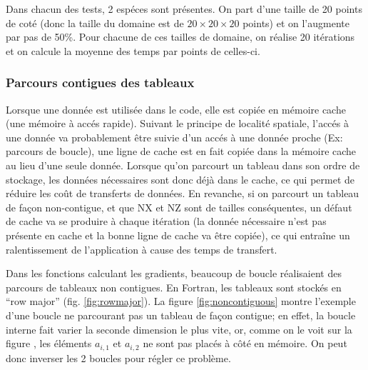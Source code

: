 Dans chacun des tests, 2 espéces sont présentes. On part d'une taille de 20 points de coté (donc la taille du domaine est de $20\times20\times20$ points) et on l'augmente par pas de 50\%. Pour chacune de ces tailles de domaine, on réalise 20 itérations et on calcule la moyenne des temps par points de celles-ci.

\subsubsection{Parcours contigues des tableaux}
Lorsque une donnée est utilisée dans le code, elle est copiée en mémoire cache (une mémoire à accés rapide). Suivant le principe de localité spatiale, l'accés à une donnée va probablement être suivie d'un accés à une donnée proche (Ex: parcours de boucle), une ligne de cache est en fait copiée dans la mémoire cache au lieu d'une seule donnée. 
Lorsque qu'on parcourt un tableau dans son ordre de stockage, les données nécessaires sont donc déjà dans le cache, ce qui permet de réduire les coût de transferts de données. En revanche, si on parcourt un tableau de façon non-contigue, et que NX et NZ sont de tailles conséquentes, un défaut de cache va se produire à chaque itération (la donnée nécessaire n'est pas présente en cache et la bonne ligne de cache va être copiée), ce qui entraîne un ralentissement de l'application à cause des temps de transfert.

Dans les fonctions calculant les gradients, beaucoup de boucle réalisaient des parcours de tableaux non contigues. En Fortran, les tableaux sont stockés en ``row major'' (fig. \ref{fig:rowmajor}). La figure \ref{fig:noncontiguous} montre l'exemple d'une boucle ne parcourant pas un tableau de façon contigue; en effet, la boucle interne fait varier la seconde dimension le plus vite, or, comme on le voit sur la figure , les éléments $a_{i,1}$ et $a_{i,2}$ ne sont pas placés à côté en mémoire. On peut donc inverser les 2 boucles pour régler ce problème.

